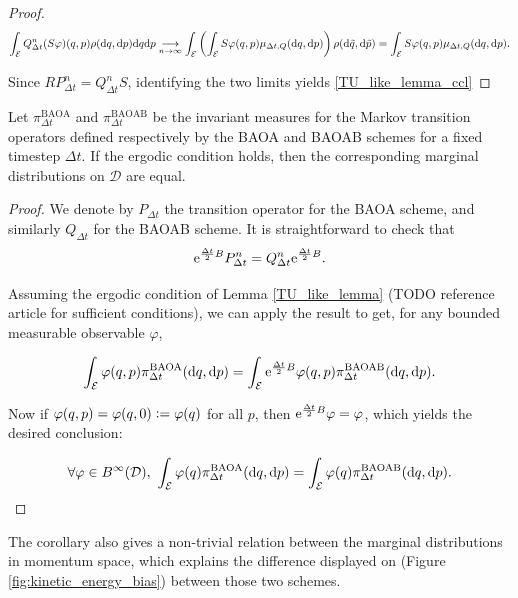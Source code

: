 \begin{lemma}
\begin{proof}
        $$ \int_{\mathcal E} Q_{\Delta t}^n (S\varphi)(q,p) \rho(\text d q,\text d p) \text d q \text d p \underset{n\to\infty}{\longrightarrow}\int_{\mathcal E} \left (\int_{\mathcal E}S\varphi(q,p)\mu_{\Delta t,Q}(\text d q,\text d p)\right)\rho(\text d \tilde q,\text d \tilde p)=\int_{\mathcal E}S\varphi(q,p)\mu_{\Delta t,Q}(\text d q,\text d p).$$

        Since $RP_{\Delta t}^n=Q_{\Delta t}^n S$, identifying the two limits yields \eqref{TU_like_lemma_ccl}
    \end{proof}
\end{lemma}

\begin{corollary}
Let $ \pi^{\mathrm{BAOA}}_{\Delta t}$ and $\pi^{\mathrm{BAOAB}}_{\Delta t}$ be the invariant measures for the Markov transition operators defined respectively by the BAOA and BAOAB schemes for a fixed timestep $\Delta t$. If the ergodic condition holds, then the corresponding marginal distributions on $\mathcal D$ are equal.

\begin{proof}
    We denote by $P_{\Delta t}$ the transition operator for the BAOA scheme, and similarly $Q_{\Delta t}$ for the BAOAB scheme. It is straightforward to check that 
    $$ \mathrm{e}^{\frac{\Delta t}2 B}P_{\Delta t}^n=Q_{\Delta t}^n \mathrm{e}^{\frac{\Delta t}2 B}.$$

    Assuming the ergodic condition of Lemma \ref{TU_like_lemma} (TODO reference article for sufficient conditions), we can apply the result to get, for any bounded measurable observable $\varphi$,

    $$ \int_{\mathcal E} \varphi(q,p)\pi^{\mathrm{BAOA}}_{\Delta t}(\text d q,\text d p)=\int_{\mathcal E} \mathrm{e}^{\frac{\Delta t}2 B}\varphi(q,p)\pi^{\mathrm{BAOAB}}_{\Delta t}(\text d q,\text d p).$$

    Now if $\varphi (q,p)= \varphi (q,0) \mathrel{\mathop:}= \varphi(q)$ for all $p$, then $\mathrm{e}^{\frac{\Delta t}2 B}\varphi=\varphi$, which yields the desired conclusion:

    $$\forall \varphi \in B^\infty(\mathcal D),\ \int_{\mathcal E} \varphi(q)\pi^{\mathrm{BAOA}}_{\Delta t}(\text d q,\text d p)=\int_{\mathcal E}\varphi(q)\pi^{\mathrm{BAOAB}}_{\Delta t}(\text d q,\text d p).$$
\end{proof}

\end{corollary}

The corollary also gives a non-trivial relation between the marginal distributions in momentum space, which explains the difference displayed on (Figure \ref{fig:kinetic_energy_bias}) between those two schemes.



